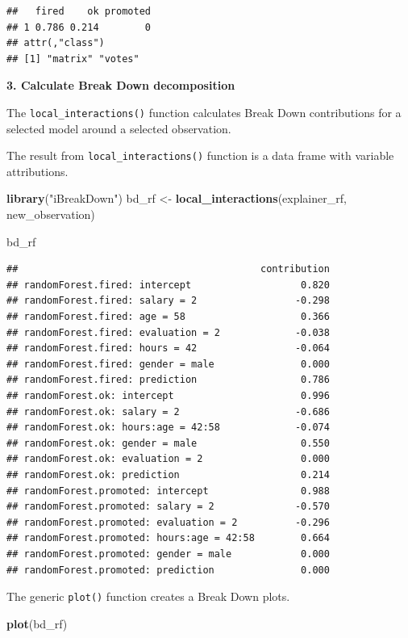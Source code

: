 \documentclass[12pt,]{krantz}
\newenvironment{Shaded}{\begin{snugshade}}{\end{snugshade}}
\newcommand{\KeywordTok}[1]{\textcolor[rgb]{0.13,0.29,0.53}{\textbf{#1}}}
\newcommand{\NormalTok}[1]{#1}
\newcommand{\StringTok}[1]{\textcolor[rgb]{0.31,0.60,0.02}{#1}}
\theoremstyle{definition}
\theoremstyle{definition}
\theoremstyle{definition}
\theoremstyle{remark}
\begin{document}
\begin{verbatim}
##   fired    ok promoted
## 1 0.786 0.214        0
## attr(,"class")
## [1] "matrix" "votes"
\end{verbatim}

\textbf{3. Calculate Break Down decomposition}

The \texttt{local\_interactions()} function calculates Break Down
contributions for a selected model around a selected observation.

The result from \texttt{local\_interactions()} function is a data frame
with variable attributions.

\begin{Shaded}
\begin{Highlighting}[]
\KeywordTok{library}\NormalTok{(}\StringTok{"iBreakDown"}\NormalTok{)}
\NormalTok{bd_rf <-}\StringTok{ }\KeywordTok{local_interactions}\NormalTok{(explainer_rf,}
\NormalTok{                 new_observation)}

\NormalTok{bd_rf}
\end{Highlighting}
\end{Shaded}

\begin{verbatim}
##                                          contribution
## randomForest.fired: intercept                   0.820
## randomForest.fired: salary = 2                 -0.298
## randomForest.fired: age = 58                    0.366
## randomForest.fired: evaluation = 2             -0.038
## randomForest.fired: hours = 42                 -0.064
## randomForest.fired: gender = male               0.000
## randomForest.fired: prediction                  0.786
## randomForest.ok: intercept                      0.996
## randomForest.ok: salary = 2                    -0.686
## randomForest.ok: hours:age = 42:58             -0.074
## randomForest.ok: gender = male                  0.550
## randomForest.ok: evaluation = 2                 0.000
## randomForest.ok: prediction                     0.214
## randomForest.promoted: intercept                0.988
## randomForest.promoted: salary = 2              -0.570
## randomForest.promoted: evaluation = 2          -0.296
## randomForest.promoted: hours:age = 42:58        0.664
## randomForest.promoted: gender = male            0.000
## randomForest.promoted: prediction               0.000
\end{verbatim}

The generic \texttt{plot()} function creates a Break Down plots.

\begin{Shaded}
\begin{Highlighting}[]
\KeywordTok{plot}\NormalTok{(bd_rf) }
\end{Highlighting}
\end{Shaded}
\end{document}

